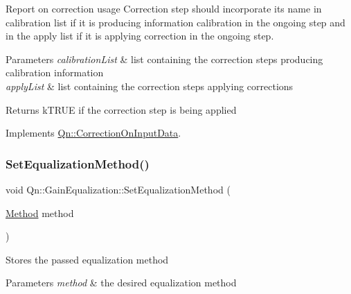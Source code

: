 Report on correction usage Correction step should incorporate its name in calibration list if it is producing information calibration in the ongoing step and in the apply list if it is applying correction in the ongoing step. 
\begin{DoxyParams}{Parameters}
{\em calibration\+List} & list containing the correction steps producing calibration information \\
\hline
{\em apply\+List} & list containing the correction steps applying corrections \\
\hline
\end{DoxyParams}
\begin{DoxyReturn}{Returns}
k\+T\+R\+UE if the correction step is being applied 
\end{DoxyReturn}


Implements \mbox{\hyperlink{classQn_1_1CorrectionOnInputData_a40b05b6db47e8dd52e1f6a616b9b9d3a}{Qn\+::\+Correction\+On\+Input\+Data}}.

\mbox{\label{classQn_1_1GainEqualization_a9e255e692f67af4a534017bc9d0ae630}} 
\subsubsection{\texorpdfstring{Set\+Equalization\+Method()}{SetEqualizationMethod()}}
{\footnotesize\ttfamily void Qn\+::\+Gain\+Equalization\+::\+Set\+Equalization\+Method (\begin{DoxyParamCaption}\item[{\mbox{\hyperlink{classQn_1_1GainEqualization_ab49157ee7419c78638467d5a070c2c23}{Method}}}]{method }\end{DoxyParamCaption})\hspace{0.3cm}{\ttfamily [inline]}}

Stores the passed equalization method 
\begin{DoxyParams}{Parameters}
{\em method} & the desired equalization method \\
\hline
\end{DoxyParams}
\mbox{\label{classQn_1_1GainEqualization_aa21fb2cf56b3fc4b7fc8d7c0c2a99da3}} 

